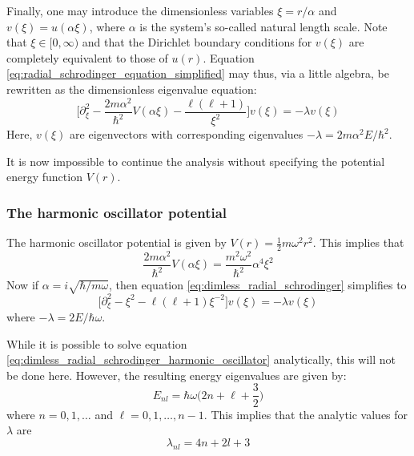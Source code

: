 \documentclass[reprint,english]{revtex4-1}
\begin{document}
Finally, one may introduce the dimensionless variables \(\xi=r/\alpha\) and \(v(\xi)=u(\alpha\xi)\), where \(\alpha\) is the system's so-called natural length scale. Note that \(\xi\in[0,\infty)\) and that the Dirichlet boundary conditions for \(v(\xi)\) are completely equivalent to those of \(u(r)\). Equation \eqref{eq:radial_schrodinger_equation_simplified} may thus, via a little algebra, be rewritten as the dimensionless eigenvalue equation:
\begin{equation}\label{eq:dimless_radial_schrodinger}
\Big[\partial_\xi^2-\frac{2m\alpha^2}{\hbar^2}V(\alpha\xi)-\frac{\ell(\ell+1)}{\xi^2}\Big]v(\xi)=-\lambda v(\xi)
\end{equation}
Here, \(v(\xi)\) are eigenvectors with corresponding eigenvalues \(-\lambda=2m\alpha^2E/\hbar^2\).

It is now impossible to continue the analysis without specifying the potential energy function \(V(r)\).
\subsubsection{The harmonic oscillator potential}
The harmonic oscillator potential is given by \(V(r)=\frac{1}{2}m\omega^2r^2\). This implies that
\[\frac{2m\alpha^2}{\hbar^2}V(\alpha\xi)=\frac{m^2\omega^2}{\hbar^2}\alpha^4\xi^2\]
Now if \(\alpha=i\sqrt{\hbar/m\omega}\), then equation \eqref{eq:dimless_radial_schrodinger} simplifies to
\begin{equation}\label{eq:dimless_radial_schrodinger_harmonic_oscillator}
\Big[\partial_\xi^2-\xi^2-\ell(\ell+1)\xi^{-2}\Big]v(\xi)=-\lambda v(\xi)
\end{equation}
where \(-\lambda=2E/\hbar\omega\).

While it is possible to solve equation \eqref{eq:dimless_radial_schrodinger_harmonic_oscillator} analytically, this will not be done here. However, the resulting energy eigenvalues are given by:
\begin{equation}\label{eq:harmonic_oscillator_energies}
E_{nl}=\hbar\omega\bigg(2n+\ell+\frac{3}{2}\bigg)
\end{equation}
where \(n=0,1,\ldots\) and \(\ell=0,1,\ldots,n-1\). This implies that the analytic values for \(\lambda\) are
\begin{equation}\label{eq:harmonic_oscillator_dimless_eigenvalues}
\lambda_{nl}=4n+2l+3
\end{equation}
\end{document}
